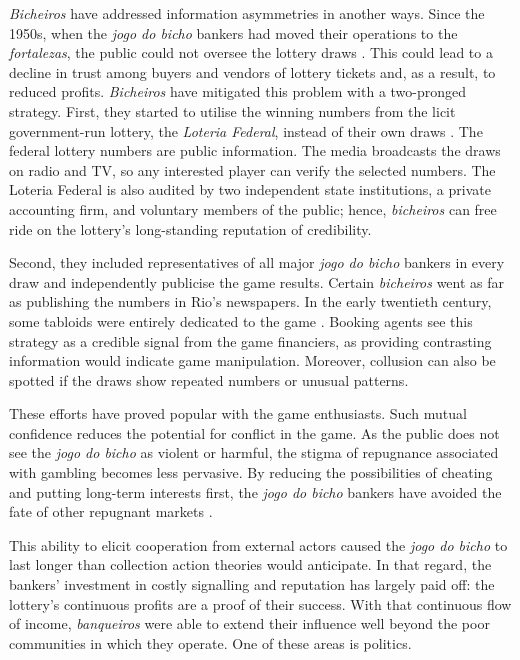 \documentclass[a4paper,12pt]{article}
\begin{document}
\textit{Bicheiros} have addressed information asymmetries in another ways. Since the 1950s, when the \textit{jogo do bicho} bankers had moved their operations to the \textit{fortalezas}, the public could not oversee the lottery draws \citep[259]{chazkel2011laws}. This could lead to a decline in trust among buyers and vendors of lottery tickets and, as a result, to reduced profits. \textit{Bicheiros} have mitigated this problem with a two-pronged strategy. First, they started to utilise the winning numbers from the licit government-run lottery, the \textit{Loteria Federal}, instead of their own draws \citetext{\citealp[546]{chazkel2007beyond}; \citealp[89]{labronici2012paratodos}; \citealp[39-40]{mello1989historia}}. The federal lottery numbers are public information. The media broadcasts the draws on radio and TV, so any interested player can verify the selected numbers. The Loteria Federal is also audited by two independent state institutions, a private accounting firm, and voluntary members of the public; hence, \textit{bicheiros} can free ride on the lottery's long-standing reputation of credibility.

Second, they included representatives of all major \textit{jogo do bicho} bankers in every draw and independently publicise the game results. Certain \textit{bicheiros} went as far as publishing the numbers in Rio's newspapers. In the early twentieth century, some tabloids were entirely dedicated to the game \citep[60]{magalhaes2005ganhou}. Booking agents see this strategy as a credible signal from the game financiers, as providing contrasting information would indicate game manipulation. Moreover, collusion can also be spotted if the draws show repeated numbers or unusual patterns.

These efforts have proved popular with the game enthusiasts. Such mutual confidence reduces the potential for conflict in the game. As the public does not see the \textit{jogo do bicho} as violent or harmful, the stigma of repugnance associated with gambling becomes less pervasive. By reducing the possibilities of cheating and putting long-term interests first, the \textit{jogo do bicho} bankers have avoided the fate of other repugnant markets \citep[20]{da1999aguias}.

This ability to elicit cooperation from external actors caused the \textit{jogo do bicho} to last longer than collection action theories would anticipate. In that regard, the bankers' investment in costly signalling and reputation has largely paid off: the lottery's continuous profits are a proof of their success. With that continuous flow of income, \textit{banqueiros} were able to extend their influence well beyond the poor communities in which they operate. One of these areas is politics. 
\end{document}

